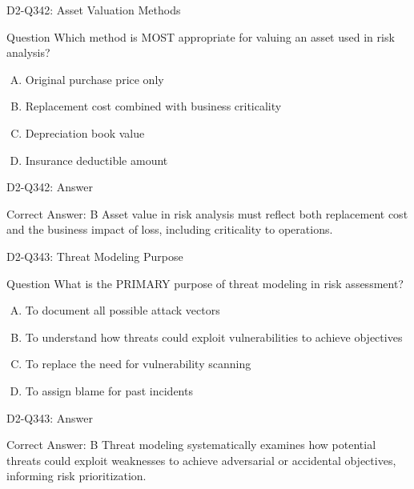 \documentclass{beamer}
\begin{document}
\begin{frame}{D2-Q342: Asset Valuation Methods}
	\begin{block}{Question}
		Which method is MOST appropriate for valuing an asset used in risk analysis?
	\end{block}
	\begin{enumerate}[(A)]
		\item Original purchase price only
		\item Replacement cost combined with business criticality
		\item Depreciation book value
		\item Insurance deductible amount
	\end{enumerate}
\end{frame}
\begin{frame}{D2-Q342: Answer}
	\begin{block}{Correct Answer: B}
		Asset value in risk analysis must reflect both replacement cost and the business impact of loss, including criticality to operations.
	\end{block}
\end{frame}

\begin{frame}{D2-Q343: Threat Modeling Purpose}
	\begin{block}{Question}
		What is the PRIMARY purpose of threat modeling in risk assessment?
	\end{block}
	\begin{enumerate}[(A)]
		\item To document all possible attack vectors
		\item To understand how threats could exploit vulnerabilities to achieve objectives
		\item To replace the need for vulnerability scanning
		\item To assign blame for past incidents
	\end{enumerate}
\end{frame}
\begin{frame}{D2-Q343: Answer}
	\begin{block}{Correct Answer: B}
		Threat modeling systematically examines how potential threats could exploit weaknesses to achieve adversarial or accidental objectives, informing risk prioritization.
	\end{block}
\end{frame}
\end{document}
